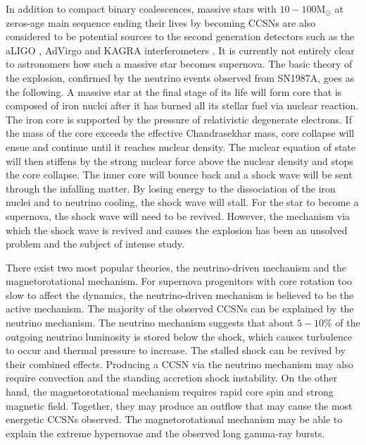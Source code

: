 \documentclass[aps,twocolumn,showpacs,groupedaddress, nofootinbib]{revtex4}  %
\begin{document}
In addition to compact binary coalescences, massive stars with $10-100 \text{M}_\odot $ at zeros-age main sequence ending their lives by becoming 
\acp{CCSN} are also considered to be potential sources to the second generation detectors such as the \ac{aLIGO} \cite{aasi2015advanced}, 
\ac{AdVirgo} \cite{acernese2014advanced} and KAGRA interferometers \cite{aso2013interferometer, gossan2016observing, abbott2016first}.
It is currently not entirely clear to astronomers how such a massive star becomes supernova. 
The basic theory of the explosion, confirmed by the neutrino events observed from SN1987A\cite{sato1987analysis}, goes as the following.
A massive star at the final stage of its life will form core that is composed of iron nuclei after it has burned all its stellar fuel via nuclear reaction.
The iron core is supported by the pressure of relativistic degenerate electrons.
If the mass of the core exceeds the effective Chandrasekhar mass\cite{baron1990effect, bethe1990supernova}, core collapse will ensue and continue until it reaches nuclear density.
The nuclear equation of state will then stiffens by the strong nuclear force above the nuclear density and stops 
the core collapse.
The inner core will bounce back and a shock wave will be sent through the infalling matter.
By losing energy to the dissociation of the iron nuclei and to neutrino cooling, the shock wave will stall.
For the star to become a supernova, the shock wave will need to be revived\cite{o2011black}.  
However, the mechanism via which the shock wave is revived and causes the explosion has been an unsolved problem and the subject of intense study.

There exist two most popular theories, the neutrino-driven mechanism\cite{bethe1985revival, bethe1990supernova} and the magnetorotational mechanism\cite{janka2012explosion, kotake2012core, mezzacappa2014two}.
For supernova progenitors with core rotation too slow to affect the dynamics\cite{takiwaki2016three, summa2018rotation}, the neutrino-driven mechanism is believed to be the active mechanism.
The majority of the observed \acp{CCSN} can be explained by the neutrino mechanism\cite{bruenn2016development}.
The neutrino mechanism\cite{bethe1985revival, janka2007theory} suggests that about $5-10\%$ of the outgoing neutrino luminosity is stored below the shock, 
which causes turbulence to occur and thermal pressure to increase.
The stalled shock can be revived by their combined effects\cite{couch2015role}. 
Producing a \ac{CCSN} via the neutrino mechanism may also require convection and the standing accretion shock instability\cite{blondin2003stability}.
On the other hand, the magnetorotational mechanism requires rapid core spin and strong magnetic field\cite{leblanc1970numerical, burrows2007simulations, takiwaki2009special, moiseenko2006magnetorotational,mosta2014magnetorotational}. 
Together, they may produce an outflow that may cause the most energetic \acp{CCSN} observed.
The magnetorotational mechanism may be able to explain the extreme hypernovae and the observed long gamma-ray bursts\cite{woosley2006progenitor, yoon2005evolution, de2013rotation}.
 
\end{document}

